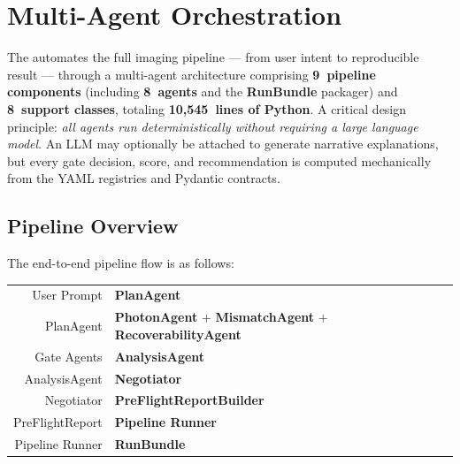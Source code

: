 
\section{Multi-Agent Orchestration}
\label{sec:agents}

The \pwm{} automates the full imaging pipeline --- from user intent to
reproducible result --- through a multi-agent architecture comprising
\textbf{9~pipeline components} (including \textbf{8~agents} and the \textbf{RunBundle} packager) and \textbf{8~support classes}, totaling
\textbf{10,545~lines of Python}.  A critical design principle: \emph{all
agents run deterministically without requiring a large language model}.
An LLM may optionally be attached to generate narrative explanations,
but every gate decision, score, and recommendation is computed
mechanically from the YAML registries and Pydantic contracts.

\subsection{Pipeline Overview}

The end-to-end pipeline flow is as follows:
%
\begin{center}
\small
\begin{tabular}{@{}r@{\;$\rightarrow$\;}l@{}}
User Prompt       & \textbf{PlanAgent} \\
PlanAgent         & \textbf{PhotonAgent} $+$ \textbf{MismatchAgent}
                    $+$ \textbf{RecoverabilityAgent} \\
Gate Agents       & \textbf{AnalysisAgent} \\
AnalysisAgent     & \textbf{Negotiator} \\
Negotiator        & \textbf{PreFlightReportBuilder} \\
PreFlightReport   & \textbf{Pipeline Runner} \\
Pipeline Runner   & \textbf{RunBundle} \\
\end{tabular}
\end{center}

